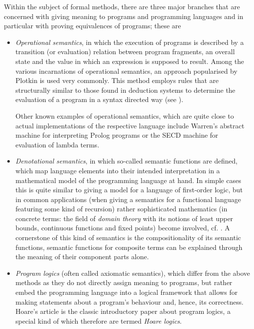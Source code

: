Within the subject of formal methods, there are three major branches that are
concerned with giving meaning to programs and programming languages and in
particular with proving equivalences of programs; these are
\begin{itemize}
\item \emph{Operational semantics}, in which the execution of programs is
  described by a transition (or evaluation) relation between program fragments,
  an overall state and the value in which an expression is supposed to result.
  Among the various incarnations of operational semantics, an approach
  popularised by Plotkin is used very commonly. This method employs rules that
  are structurally similar to those found in deduction systems to determine the
  evaluation of a program in a syntax directed way (see \cite{Plotkin81}).
  
  Other known examples of operational semantics, which are quite close to actual
  implementations of the respective language include Warren's abstract machine
  for interpreting Prolog programs or the SECD machine for evaluation of lambda
  terms.
\item \emph{Denotational semantics}, in which so-called semantic functions are
  defined, which map language elements into their intended interpretation in a
  mathematical model of the programming language at hand.  In simple cases this
  is quite similar to giving a model for a language of first-order logic, but in
  common applications (\EG when giving a semantics for a functional language
  featuring some kind of recursion) rather sophisticated mathematics (in
  concrete terms: the field of \emph{domain theory} with its notions of least
  upper bounds, continuous functions and fixed points) become involved, cf.
  \cite{Reynolds98,Winskel93}. A cornerstone of this kind of semantics is the
  compositionality of its semantic functions, \IE semantic functions for
  composite terms can be explained through the meaning of their component parts
  alone.
  
\item \emph{Program logics} (often called axiomatic semantics), which differ
  from the above methods as they do not directly assign meaning to programs, but
  rather embed the programming language into a logical framework that allows for
  making statements about a program's behaviour and, hence, its correctness.
  Hoare's article \cite{Hoare69} is the classic introductory paper about program
  logics, a special kind of which therefore are termed \emph{Hoare logics}.

\end{itemize}

